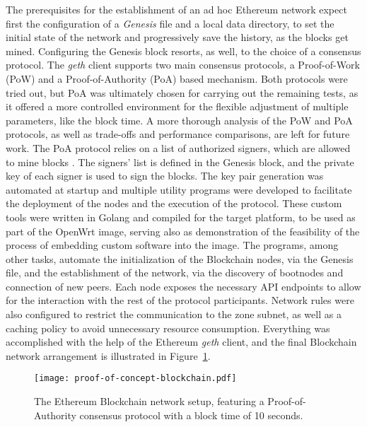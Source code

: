 The prerequisites for the establishment of an ad hoc Ethereum network expect first the configuration of a \emph{Genesis} file and a local data directory, to set the initial state of the network and progressively save the history, as the blocks get mined. Configuring the Genesis block resorts, as well, to the choice of a consensus protocol. The \emph{geth} client supports two main consensus protocols, a Proof-of-Work (PoW) and a Proof-of-Authority (PoA) based mechanism. Both protocols were tried out, but PoA was ultimately chosen for carrying out the remaining tests, as it offered a more controlled environment for the flexible adjustment of multiple parameters, like the block time. A more thorough analysis of the PoW and PoA protocols, as well as trade-offs and performance comparisons, are left for future work. The PoA protocol relies on a list of authorized signers, which are allowed to mine blocks \cite{clique-eth}. The signers' list is defined in the Genesis block, and the private key of each signer is used to sign the blocks. The key pair generation was automated at startup and multiple utility programs were developed to facilitate the deployment of the nodes and the execution of the protocol. These custom tools were written in Golang and compiled for the target platform, to be used as part of the OpenWrt image, serving also as demonstration of the feasibility of the process of embedding custom software into the image. The programs, among other tasks, automate the initialization of the Blockchain nodes, via the Genesis file, and the establishment of the network, via the discovery of bootnodes and connection of new peers. Each node exposes the necessary API endpoints to allow for the interaction with the rest of the protocol participants. Network rules were also configured to restrict the communication to the zone subnet, as well as a caching policy to avoid unnecessary resource consumption. Everything was accomplished with the help of the Ethereum \emph{geth} client, and the final Blockchain network arrangement is illustrated in Figure~\ref{fig:pol-implementation:blockchain-network}.

\begin{figure}[h!]
    \begin{center}
    \texttt{[image: proof-of-concept-blockchain.pdf]}
    \caption{The Ethereum Blockchain network setup, featuring a Proof-of-Authority consensus protocol with a block time of 10 seconds.}
    \label{fig:pol-implementation:blockchain-network}
    \end{center}
\end{figure}

